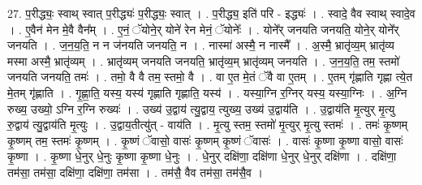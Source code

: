\documentclass[17pt]{extarticle}
\begin{document}
27. प॒रीद्ध्यः॒ स्वाथ् स्वात् प॒रीद्ध्यः॑ प॒रीद्ध्यः॒ स्वात् । . प॒रीद्ध्य॒ इति॑ परि - इद्ध्यः॑ । . स्वादे॒ वैव स्वाथ् स्वादे॒व । . ए॒वैन॑ मेन मे॒वै वैन᳚म् । . ए॒नं॒ ॅयोने॒र् योने॑ रेन मेनं॒ ॅयोनेः᳚ । . योने᳚र् जनयति जनयति॒ योने॒र् योने᳚र् जनयति । . ज॒न॒य॒ति॒ न न ज॑नयति जनयति॒ न । . नास्मा॑ अस्मै॒ न नास्मै᳚ । . अ॒स्मै॒ भ्रातृ॑व्य॒म् भ्रातृ॑व्य मस्मा अस्मै॒ भ्रातृ॑व्यम् । . भ्रातृ॑व्यम् जनयति जनयति॒ भ्रातृ॑व्य॒म् भ्रातृ॑व्यम् जनयति । . ज॒न॒य॒ति॒ तम॒ स्तमो॑ जनयति जनयति॒ तमः॑ । . तमो॒ वै वै तम॒ स्तमो॒ वै । . वा ए॒त मे॒तं ॅवै वा ए॒तम् । . ए॒तम् गृ॑ह्णाति गृह्णा त्ये॒त मे॒तम् गृ॑ह्णाति । . गृ॒ह्णा॒ति॒ यस्य॒ यस्य॑ गृह्णाति गृह्णाति॒ यस्य॑ । . यस्या॒ग्नि र॒ग्निर् यस्य॒ यस्या॒ग्निः । . अ॒ग्नि रुख्य॒ उख्यो॒ ऽग्नि र॒ग्नि रुख्यः॑ । . उख्य॑ उ॒द्वाय॑ त्यु॒द्वाय॒ त्युख्य॒ उख्य॑ उ॒द्वाय॑ति । . उ॒द्वाय॑ति मृ॒त्युर् मृ॒त्यु रु॒द्वाय॑ त्यु॒द्वाय॑ति मृ॒त्युः । . उ॒द्वाय॒तीत्यु॑त् - वाय॑ति । . मृ॒त्यु स्तम॒ स्तमो॑ मृ॒त्युर् मृ॒त्यु स्तमः॑ । . तमः॑ कृ॒ष्णम् कृ॒ष्णम् तम॒ स्तमः॑ कृ॒ष्णम् । . कृ॒ष्णं ॅवासो॒ वासः॑ कृ॒ष्णम् कृ॒ष्णं ॅवासः॑ । . वासः॑ कृ॒ष्णा कृ॒ष्णा वासो॒ वासः॑ कृ॒ष्णा । . कृ॒ष्णा धे॒नुर् धे॒नुः कृ॒ष्णा कृ॒ष्णा धे॒नुः । . धे॒नुर् दक्षि॑णा॒ दक्षि॑णा धे॒नुर् धे॒नुर् दक्षि॑णा । . दक्षि॑णा॒ तम॑सा॒ तम॑सा॒ दक्षि॑णा॒ दक्षि॑णा॒ तम॑सा । . तम॑सै॒ वैव तम॑सा॒ तम॑सै॒व । \newline
\end{document}
